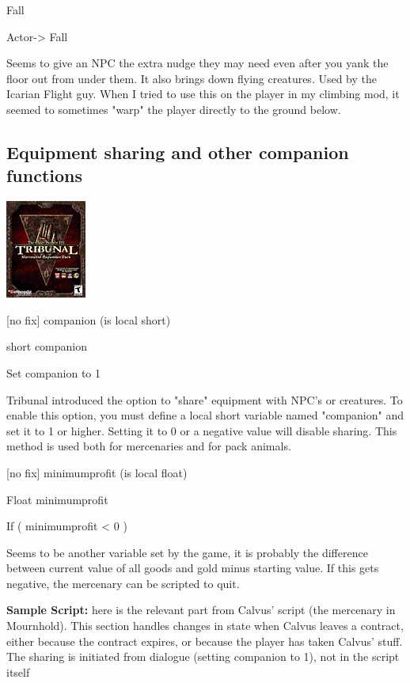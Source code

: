Fall

Actor-> Fall

Seems to give an NPC the extra nudge they may need even after you yank
the floor out from under them. It also brings down flying creatures.
Used by the Icarian Flight guy. When I tried to use this on the player
in my climbing mod, it seemed to sometimes "warp" the player directly to
the ground below.

\hypertarget{equipment-sharing-and-other-companion-functions}{%
\subsection{Equipment sharing and other companion
functions}\label{equipment-sharing-and-other-companion-functions}}

\includegraphics{media/image6.png}

{[}no fix{]} companion (is local short)

short companion

Set companion to 1

Tribunal introduced the option to "share" equipment with NPC's or
creatures. To enable this option, you must define a local short variable
named "companion" and set it to 1 or higher. Setting it to 0 or a
negative value will disable sharing. This method is used both for
mercenaries and for pack animals.

{[}no fix{]} minimumprofit (is local float)

Float minimumprofit

If ( minimumprofit < 0 )

Seems to be another variable set by the game, it is probably the
difference between current value of all goods and gold minus starting
value. If this gets negative, the mercenary can be scripted to quit.

\textbf{Sample Script:} here is the relevant part from Calvus' script
(the mercenary in Mournhold). This section handles changes in state when
Calvus leaves a contract, either because the contract expires, or
because the player has taken Calvus' stuff. The sharing is initiated
from dialogue (setting companion to 1), not in the script itself

